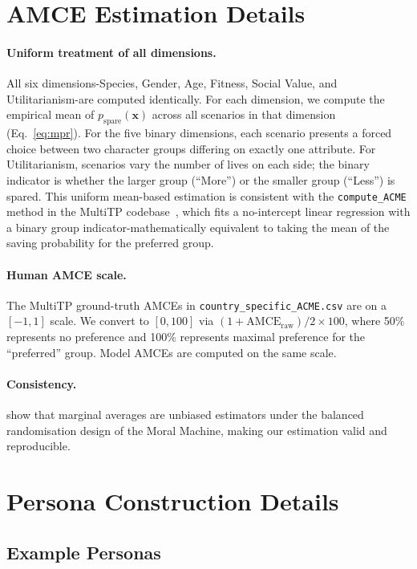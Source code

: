\documentclass{article}
\begin{document}
\section{AMCE Estimation Details}
\label{app:amce}

\paragraph{Uniform treatment of all dimensions.} All six dimensions-Species,
Gender, Age, Fitness, Social Value, and Utilitarianism-are computed identically.
For each dimension, we compute the empirical mean of
$p_{\text{spare}}(\mathbf{x})$ across all scenarios in that dimension
(Eq.~\ref{eq:mpr}). For the five binary dimensions, each scenario presents a
forced choice between two character groups differing on exactly one attribute.
For Utilitarianism, scenarios vary the number of lives on each side; the binary
indicator is whether the larger group (``More'') or the smaller group (``Less'')
is spared. This uniform mean-based estimation is consistent with the
\texttt{compute\_ACME} method in the MultiTP codebase~\citep{jin2025multitp},
which fits a no-intercept linear regression with a binary group indicator-mathematically equivalent to taking the mean of the saving probability for
the preferred group.

\paragraph{Human AMCE scale.} The MultiTP ground-truth AMCEs in
\texttt{country\_specific\_ACME.csv} are on a $[-1, 1]$ scale. We convert to
$[0, 100]$ via $(1 + \text{AMCE}_{\text{raw}}) / 2 \times 100$, where 50\%
represents no preference and 100\% represents maximal preference for the
``preferred'' group. Model AMCEs are computed on the same scale.

\paragraph{Consistency.} \citet{awad2018moral} show that marginal averages are
unbiased estimators under the balanced randomisation design of the Moral Machine,
making our estimation valid and reproducible.

\section{Persona Construction Details}
\label{app:personas}

\subsection{Example Personas}
\end{document}
